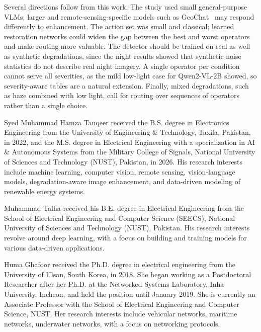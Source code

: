 \documentclass[lettersize,journal]{IEEEtran}
\begin{document}
Several directions follow from this work. The study used small general-purpose VLMs; larger and remote-sensing-specific models such as GeoChat~\cite{kuckreja2024geochat} may respond differently to enhancement. The action set was small and classical; learned restoration networks could widen the gap between the best and worst operators and make routing more valuable. The detector should be trained on real as well as synthetic degradations, since the night results showed that synthetic noise statistics do not describe real night imagery. A single operator per condition cannot serve all severities, as the mild low-light case for Qwen2-VL-2B showed, so severity-aware tables are a natural extension. Finally, mixed degradations, such as haze combined with low light, call for routing over sequences of operators rather than a single choice.





\vspace{11pt}

\begin{IEEEbiographynophoto}{Syed Muhammad Hamza Tauqeer}
received the B.S. degree in Electronics Engineering from the University of Engineering \& Technology, Taxila, Pakistan, in 2022, and the M.S. degree in Electrical Engineering with a specialization in AI \& Autonomous Systems from the Military College of Signals, National University of Sciences and Technology (NUST), Pakistan, in 2026. His research interests include machine learning, computer vision, remote sensing, vision-language models, degradation-aware image enhancement, and data-driven modeling of renewable energy systems.
\end{IEEEbiographynophoto}

\begin{IEEEbiographynophoto}{Muhammad Talha} received his B.E. degree in Electrical Engineering from the School of Electrical Engineering and Computer Science (SEECS), National University of Sciences and Technology (NUST), Pakistan. His research interests revolve around deep learning, with a focus on building and training models for various data-driven applications.
\end{IEEEbiographynophoto}

\begin{IEEEbiographynophoto}{Huma Ghafoor}
received the Ph.D. degree in electrical engineering from the University of Ulsan, South Korea, in 2018. She began working as a Postdoctoral Researcher after her Ph.D. at the Networked Systems Laboratory, Inha University, Incheon, and held the position until January 2019. She is currently an Associate Professor with the School of Electrical Engineering and Computer Science, NUST. Her research interests include vehicular networks, maritime networks, underwater networks, with a focus on networking protocols.
\end{IEEEbiographynophoto}
\end{document}
